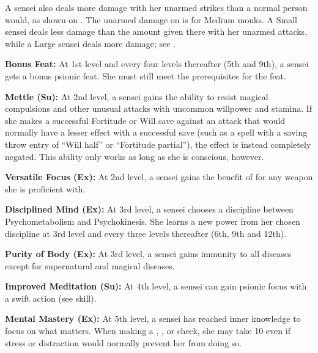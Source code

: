 {A sensei also deals more damage with her unarmed strikes than a normal person would, as shown on . The unarmed damage on  is for Medium monks. A Small sensei deals less damage than the amount given there with her unarmed attacks, while a Large sensei deals more damage; see .


\textbf{Bonus Feat:} At 1st level and every four levels thereafter (5th and 9th), a sensei gets a bonus psionic feat. She must still meet the prerequisites for the feat.

\textbf{Mettle (Su):} At 2nd level, a sensei gains the ability to resist magical compulsions and other unusual attacks with uncommon willpower and stamina. If she makes a successful Fortitude or Will save against an attack that would normally have a lesser effect with a successful save (such as a spell with a saving throw entry of ``Will half'' or ``Fortitude partial''), the effect is instead completely negated. This ability only works as long as she is conscious, however.

\textbf{Versatile Focus (Ex):} At 2nd level, a sensei gains the benefit of  for any weapon she is proficient with.

\textbf{Disciplined Mind (Ex):} At 3rd level, a sensei chooses a discipline between Psychometabolism and Psychokinesis. She learns a new power from her chosen discipline at 3rd level and every three levels thereafter (6th, 9th and 12th).

\textbf{Purity of Body (Ex):} At 3rd level, a sensei gains immunity to all diseases except for supernatural and magical diseases.

\textbf{Improved Meditation (Su):} At 4th level, a sensei can gain psionic focus with a swift action (see  skill).

\textbf{Mental Mastery (Ex):} At 5th level, a sensei has reached inner knowledge to focus on what matters. When making a , , or  check, she may take 10 even if stress or distraction would normally prevent her from doing so.

}
